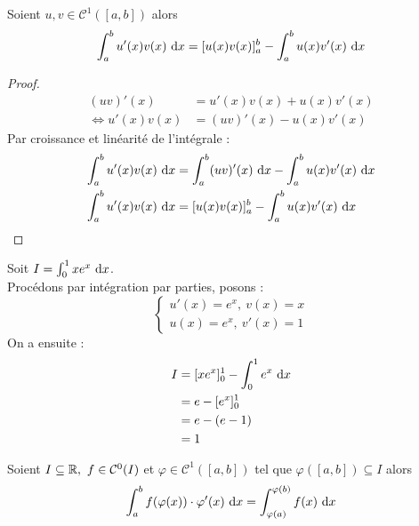 \begin{theorem}
	Soient $u, v \in \mathcal{C}^1([a, b])$ alors
	\begin{align*}
		\int_a^b u'(x) v(x) \ \diffd x = [u(x)v(x)]_a^b - \int_a^b u(x) v'(x) \ \diffd x
	\end{align*}
  \end{theorem}

\begin{proof}
    \begin{align*}
        (uv)'(x) &= u'(x) v(x) + u(x)v'(x) \\
        \iff u'(x)v(x) &= (uv)'(x) - u(x)v'(x)
    \end{align*}
    Par croissance et linéarité de l'intégrale :
    \begin{align*}
        \int_a^b u'(x)v(x) \ \diffd x &= \int_a^b (uv)'(x) \ \diffd x - \int_a^b u(x)v'(x) \ \diffd x \\
        \int_a^b u'(x)v(x) \ \diffd x &=  [u(x)v(x)]_a^b - \int_a^b u(x)v'(x) \ \diffd x 
    \end{align*}
\end{proof}

\begin{example}
	Soit $I = \int_{0}^{1} x e^x \ \diffd x$.
	\\
	Procédons par intégration par parties, posons :
	\[
	\begin{cases}
		u'(x) = e^x,\ v(x) = x \\
		u(x) = e^x,\ v'(x) = 1
	\end{cases}
	\]
	On a ensuite :
	\begin{align*}
		I &= [xe^x]_0^1 - \int_{0}^{1} e^x \ \diffd x \\
		  &= e - [e^x]_0^1 \\
		  &= e - (e - 1) \\
		  &= 1
	\end{align*}
\end{example}

\begin{theorem}
	Soient $I \subseteq \mathbb{R},\ f \in \mathcal{C}^0(I)$ et $\varphi \in \mathcal{C}^1([a, b])$ tel que $\varphi ([a, b]) \subseteq I$ alors 
	\begin{align*}
		\int_a^b f(\varphi(x)) \cdot \varphi'(x) \ \diffd x = \int_{\varphi(a)}^{\varphi(b)} f(x) \ \diffd x
	\end{align*}
\end{theorem}

